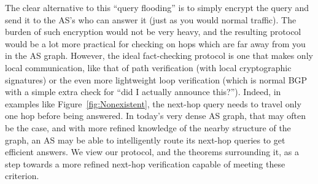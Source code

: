 \documentclass[10pt]{article}
\begin{document}
  The clear alternative to this ``query flooding'' is to simply encrypt the
  query and send it to the AS's who can answer it (just as you would normal traffic).
  The burden of such encryption would not be very heavy, and the
  resulting protocol would be a lot more practical for checking on hops which
  are far away from you in the AS graph.
  However, the ideal fact-checking protocol is one that makes only local
  communication, like that of path verification (with local cryptographic signatures)
  or the even more lightweight loop verification (which is normal BGP with a simple
  extra check for ``did I actually announce this?'').
  Indeed, in examples like Figure~\ref{fig:Nonexistent}, the next-hop query
  needs to travel only one hop before being answered.
  In today's very dense AS graph, that may often be the case,
  and with more refined knowledge of the nearby structure of the graph,
  an AS may be able to intelligently route its next-hop queries to get efficient
  answers. We view our protocol, and the theorems surrounding it, as a step
  towards a more refined next-hop verification capable of meeting these
  criterion.



\end{document}
